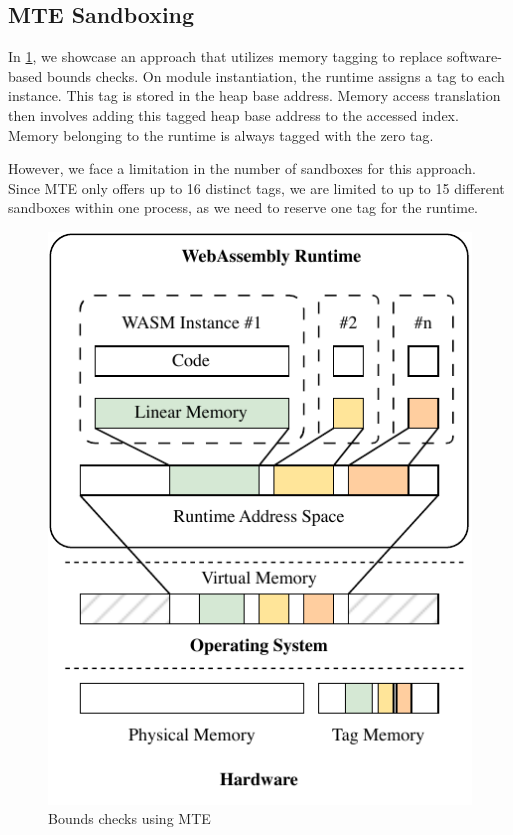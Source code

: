 \subsection{\ac{MTE} Sandboxing}
\label{subsec:bounds-checks}

In \cref{fig:system-design-sandboxing}, we showcase an approach that utilizes memory tagging to replace software-based bounds checks.
On module instantiation, the runtime assigns a tag to each instance.
This tag is stored in the heap base address.
Memory access translation then involves adding this tagged heap base address to the accessed index.
Memory belonging to the runtime is always tagged with the zero tag.

However, we face a limitation in the number of sandboxes for this approach.
Since \ac{MTE} only offers up to 16 distinct tags, we are limited to up to 15 different sandboxes within one process, as we need to reserve one tag for the runtime.

\begin{figure}[t]
  \centering
  \includegraphics[scale=1]{figures/build/system-design-1}
  \caption{Bounds checks using MTE}
  \label{fig:system-design-sandboxing}
\end{figure}

